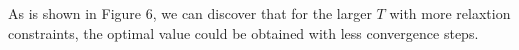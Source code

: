 As is shown in Figure 6, we can discover that for the larger $T$ with more relaxtion constraints, the optimal value could be obtained with less convergence steps.
















